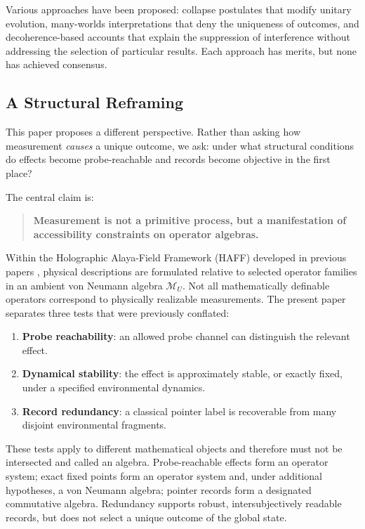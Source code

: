 \documentclass[12pt,a4paper]{article}
\begin{document}
Various approaches have been proposed: collapse postulates that modify unitary evolution, many-worlds interpretations that deny the uniqueness of outcomes, and decoherence-based accounts that explain the suppression of interference without addressing the selection of particular results. Each approach has merits, but none has achieved consensus.

\subsection{A Structural Reframing}

This paper proposes a different perspective. Rather than asking how measurement \emph{causes} a unique outcome, we ask: under what structural conditions do effects become probe-reachable and records become objective in the first place?

The central claim is:

\begin{quote}
\textbf{Measurement is not a primitive process, but a manifestation of accessibility constraints on operator algebras.}
\end{quote}

Within the Holographic Alaya-Field Framework (HAFF) developed in previous papers \cite{Liu2026PaperA,Liu2026PaperB,Liu2026PaperC,Liu2026PaperD}, physical descriptions are formulated relative to selected operator families in an ambient von Neumann algebra $\mathcal M_U$. Not all mathematically definable operators correspond to physically realizable measurements. The present paper separates three tests that were previously conflated:

\begin{enumerate}
    \item \textbf{Probe reachability}: an allowed probe channel can distinguish the relevant effect.
    \item \textbf{Dynamical stability}: the effect is approximately stable, or exactly fixed, under a specified environmental dynamics.
    \item \textbf{Record redundancy}: a classical pointer label is recoverable from many disjoint environmental fragments.
\end{enumerate}

These tests apply to different mathematical objects and therefore must not be intersected and called an algebra. Probe-reachable effects form an operator system; exact fixed points form an operator system and, under additional hypotheses, a von Neumann algebra; pointer records form a designated commutative algebra. Redundancy supports robust, intersubjectively readable records, but does not select a unique outcome of the global state.
\end{document}
